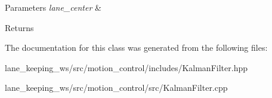 \begin{DoxyParams}{Parameters}
{\em lane\+\_\+center} & \\
\hline
\end{DoxyParams}
\begin{DoxyReturn}{Returns}

\end{DoxyReturn}


The documentation for this class was generated from the following files\+:\begin{DoxyCompactItemize}
\item 
lane\+\_\+keeping\+\_\+ws/src/motion\+\_\+control/includes/Kalman\+Filter.\+hpp\item 
lane\+\_\+keeping\+\_\+ws/src/motion\+\_\+control/src/Kalman\+Filter.\+cpp\end{DoxyCompactItemize}

